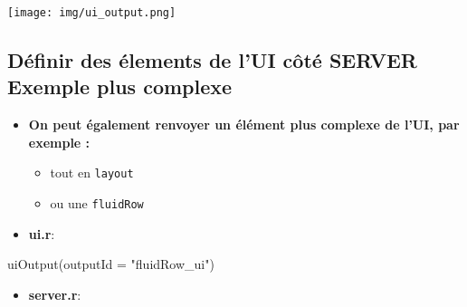 \documentclass[
]{article}
\newenvironment{Shaded}{\begin{snugshade}}{\end{snugshade}}
\newcommand{\AttributeTok}[1]{\textcolor[rgb]{0.77,0.63,0.00}{#1}}
\newcommand{\DecValTok}[1]{\textcolor[rgb]{0.00,0.00,0.81}{#1}}
\newcommand{\FunctionTok}[1]{\textcolor[rgb]{0.00,0.00,0.00}{#1}}
\newcommand{\NormalTok}[1]{#1}
\newcommand{\OtherTok}[1]{\textcolor[rgb]{0.56,0.35,0.01}{#1}}
\newcommand{\SpecialCharTok}[1]{\textcolor[rgb]{0.00,0.00,0.00}{#1}}
\newcommand{\StringTok}[1]{\textcolor[rgb]{0.31,0.60,0.02}{#1}}
\providecommand{\tightlist}{%
  \setlength{\itemsep}{0pt}\setlength{\parskip}{0pt}}
\begin{document}
\texttt{[image: img/ui\_output.png]}

\hypertarget{duxe9finir-des-uxe9lements-de-lui-cuxf4tuxe9-server-exemple-plus-complexe}{%
\subsection{Définir des élements de l'UI côté SERVER \textbar{} Exemple
plus
complexe}\label{duxe9finir-des-uxe9lements-de-lui-cuxf4tuxe9-server-exemple-plus-complexe}}

\begin{itemize}
\tightlist
\item
  \textbf{On peut également renvoyer un élément plus complexe de l'UI,
  par exemple :}

  \begin{itemize}
  \tightlist
  \item
    tout en \texttt{layout}
  \item
    ou une \texttt{fluidRow}
  \end{itemize}
\item
  \textbf{ui.r}:
\end{itemize}

\begin{Shaded}
\begin{Highlighting}[]
\FunctionTok{uiOutput}\NormalTok{(}\AttributeTok{outputId =} \StringTok{"fluidRow\_ui"}\NormalTok{)}
\end{Highlighting}
\end{Shaded}

\begin{itemize}
\tightlist
\item
  \textbf{server.r}:
\end{itemize}

\begin{Shaded}
\end{Shaded}
\end{document}
